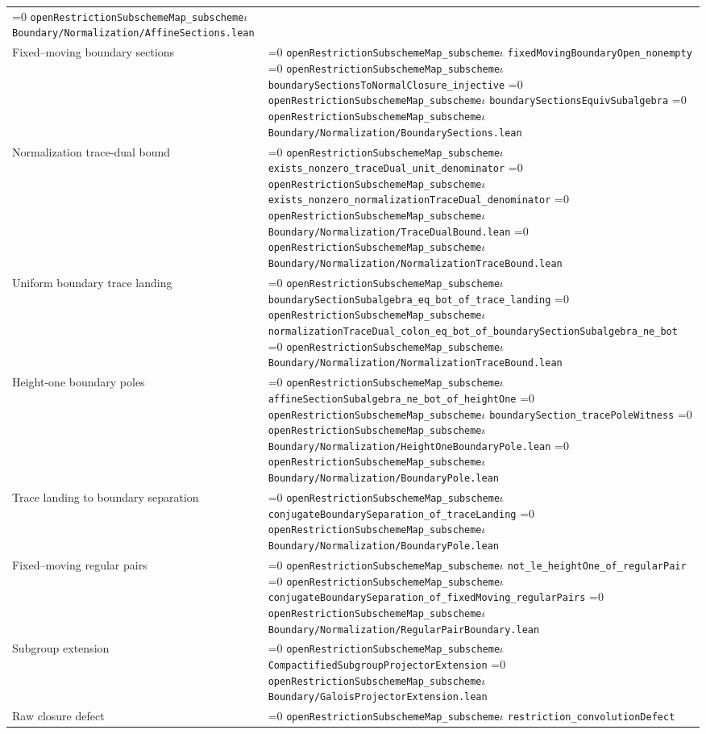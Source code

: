 \documentclass[11pt]{article}
\theoremstyle{definition}
\theoremstyle{remark}
\newcommand{\leanpath}[1]{%
  \ifnum\pdfstrcmp{\detokenize{#1}}%
      {\detokenize{openRestrictionSubschemeMap_subschemeι}}=0
    \texttt{\nolinkurl{openRestrictionSubschemeMap_subscheme}}\ensuremath{\iota}%
  \else
    \texttt{\nolinkurl{#1}}%
  \fi}
\begin{document}
\begin{longtable}{@{}>{\raggedright\arraybackslash}p{}
                >{\raggedright\arraybackslash}p{}@{}}
\leanpath{Boundary/Normalization/AffineSections.lean}\\
Fixed--moving boundary sections &
\leanpath{fixedMovingBoundaryOpen_nonempty}\newline
\leanpath{boundarySectionsToNormalClosure_injective}\newline
\leanpath{boundarySectionsEquivSubalgebra}\newline
\leanpath{Boundary/Normalization/BoundarySections.lean}\\
Normalization trace-dual bound &
\leanpath{exists_nonzero_traceDual_unit_denominator}\newline
\leanpath{exists_nonzero_normalizationTraceDual_denominator}\newline
\leanpath{Boundary/Normalization/TraceDualBound.lean}\newline
\leanpath{Boundary/Normalization/NormalizationTraceBound.lean}\\
Uniform boundary trace landing &
\leanpath{boundarySectionSubalgebra_eq_bot_of_trace_landing}\newline
\leanpath{normalizationTraceDual_colon_eq_bot_of_boundarySectionSubalgebra_ne_bot}\newline
\leanpath{Boundary/Normalization/NormalizationTraceBound.lean}\\
Height-one boundary poles &
\leanpath{affineSectionSubalgebra_ne_bot_of_heightOne}\newline
\leanpath{boundarySection_tracePoleWitness}\newline
\leanpath{Boundary/Normalization/HeightOneBoundaryPole.lean}\newline
\leanpath{Boundary/Normalization/BoundaryPole.lean}\\
Trace landing to boundary separation &
\leanpath{conjugateBoundarySeparation_of_traceLanding}\newline
\leanpath{Boundary/Normalization/BoundaryPole.lean}\\
Fixed--moving regular pairs &
\leanpath{not_le_heightOne_of_regularPair}\newline
\leanpath{conjugateBoundarySeparation_of_fixedMoving_regularPairs}\newline
\leanpath{Boundary/Normalization/RegularPairBoundary.lean}\\
Subgroup extension &
\leanpath{CompactifiedSubgroupProjectorExtension}\newline
\leanpath{Boundary/GaloisProjectorExtension.lean}\\
Raw closure defect &
\leanpath{restriction_convolutionDefect}\newline

\end{longtable}
\end{document}
